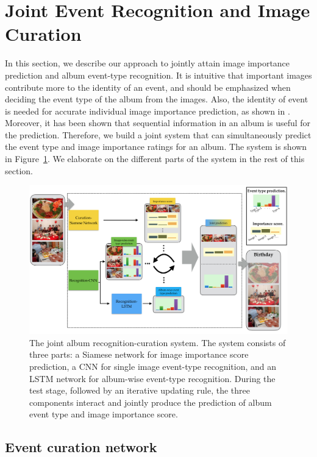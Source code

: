 \documentclass[runningheads]{llncs}
\begin{document}
\section{Joint Event Recognition and Image Curation}
\label{approach}
In this section, we describe our approach to jointly attain image importance prediction and album event-type recognition. It is intuitive that important images contribute  more to the identity of an event, and should be emphasized when deciding the event type of the album from the images. Also, the identity of event is needed for accurate individual image importance prediction, as shown in \cite{CVPR}. Moreover, it has been shown that sequential information in an album is useful for the prediction. Therefore, we build a joint system that can simultaneously predict the event type and image importance ratings for an album. The system is shown in Figure~\ref{figure1}. We  elaborate on the different parts of the system in the rest of this section.
%
%
%

\begin{figure}
\centering
\includegraphics[width=4.8in]{architecture}
\caption{The joint album recognition-curation system. The system consists of three parts: a Siamese network for image importance score prediction, a CNN for single image event-type recognition, and an LSTM network for album-wise event-type recognition. During the test stage, followed by an iterative updating rule, the three components interact and jointly produce the prediction of album event type and image importance score. }
\label{figure1}
\vspace{-0.2in}
\end{figure}

\subsection{Event curation network}
\label{curation_section}
\end{document}
